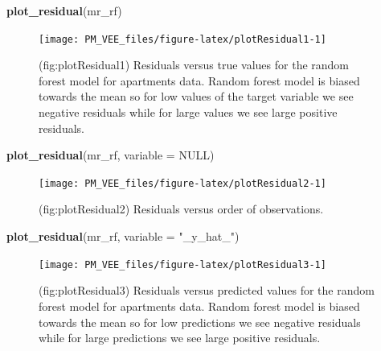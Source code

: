 \documentclass[12pt,]{krantz}
\newenvironment{Shaded}{\begin{snugshade}}{\end{snugshade}}
\newcommand{\DataTypeTok}[1]{\textcolor[rgb]{0.13,0.29,0.53}{#1}}
\newcommand{\KeywordTok}[1]{\textcolor[rgb]{0.13,0.29,0.53}{\textbf{#1}}}
\newcommand{\NormalTok}[1]{#1}
\newcommand{\OtherTok}[1]{\textcolor[rgb]{0.56,0.35,0.01}{#1}}
\newcommand{\StringTok}[1]{\textcolor[rgb]{0.31,0.60,0.02}{#1}}
\begin{document}
\begin{Shaded}
\begin{Highlighting}[]
\KeywordTok{plot_residual}\NormalTok{(mr_rf)}
\end{Highlighting}
\end{Shaded}

\begin{figure}

{\centering \texttt{[image: PM\_VEE\_files/figure-latex/plotResidual1-1]} 

}

\caption{(fig:plotResidual1) Residuals versus true values for the random forest model for apartments data. Random forest model is biased towards the mean so for low values of the target variable we see negative residuals while for large values we see large positive residuals.}\label{fig:plotResidual1}
\end{figure}

\begin{Shaded}
\begin{Highlighting}[]
\KeywordTok{plot_residual}\NormalTok{(mr_rf, }\DataTypeTok{variable =} \OtherTok{NULL}\NormalTok{)}
\end{Highlighting}
\end{Shaded}

\begin{figure}

{\centering \texttt{[image: PM\_VEE\_files/figure-latex/plotResidual2-1]} 

}

\caption{(fig:plotResidual2) Residuals versus order of observations. }\label{fig:plotResidual2}
\end{figure}

\begin{Shaded}
\begin{Highlighting}[]
\KeywordTok{plot_residual}\NormalTok{(mr_rf, }\DataTypeTok{variable =} \StringTok{"_y_hat_"}\NormalTok{)}
\end{Highlighting}
\end{Shaded}

\begin{figure}

{\centering \texttt{[image: PM\_VEE\_files/figure-latex/plotResidual3-1]} 

}

\caption{(fig:plotResidual3) Residuals versus predicted values for the random forest model for apartments data. Random forest model is biased towards the mean so for low predictions we see negative residuals while for large predictions we see large positive residuals.}\label{fig:plotResidual3}
\end{figure}
\end{document}
